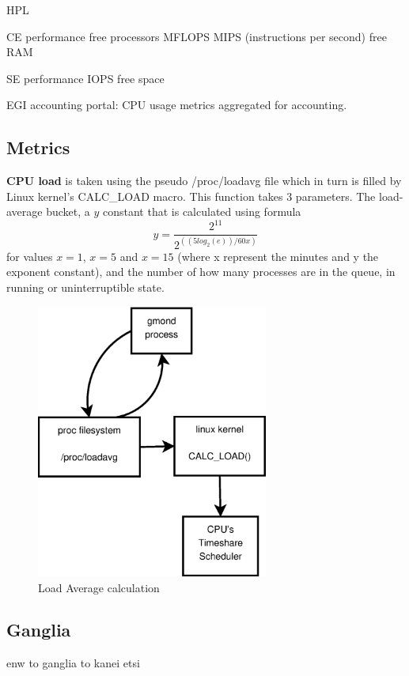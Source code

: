 HPL
\cite{gridbench}

CE performance
free processors
MFLOPS
MIPS (instructions per second)
free RAM

SE performance
IOPS
free space

EGI accounting portal: CPU usage metrics aggregated for accounting.
\newpage

\subsection{Metrics}

{\bf CPU load} is taken using the pseudo /proc/loadavg file which in turn is
filled by Linux kernel's CALC\_LOAD macro. This function takes 3 parameters.
The load-average bucket, a $y$ constant that is calculated using formula
\[
y=\frac{2^{11}}{2^{((5log_2(e))/60x)}}
\]
for values $x=1$, $x=5$ and $x=15$ (where x represent the minutes and y the
exponent constant), and the number of how many processes are in the queue, in
running or uninterruptible state.

\begin{figure}[htb]
\centering
 \includegraphics[width=3in]{images/calc_load.eps}
\caption{Load Average calculation}
\label{figure:calc_load}
\end{figure}

\newpage

\subsection{Ganglia}
enw to ganglia to kanei etsi
\newpage

